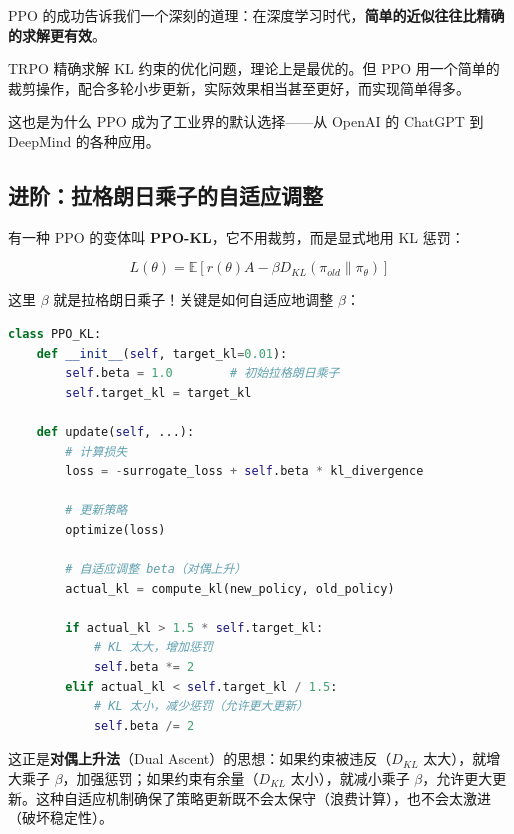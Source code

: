 \begin{remark}
PPO 的成功告诉我们一个深刻的道理：在深度学习时代，\textbf{简单的近似往往比精确的求解更有效}。

TRPO 精确求解 KL 约束的优化问题，理论上是最优的。但 PPO 用一个简单的裁剪操作，配合多轮小步更新，实际效果相当甚至更好，而实现简单得多。

这也是为什么 PPO 成为了工业界的默认选择——从 OpenAI 的 ChatGPT 到 DeepMind 的各种应用。
\end{remark}

\subsection{进阶：拉格朗日乘子的自适应调整}

有一种 PPO 的变体叫 \textbf{PPO-KL}，它不用裁剪，而是显式地用 KL 惩罚：

\begin{equation}
    L(\theta) = \mathbb{E}\left[ r(\theta) A - \beta D_{KL}(\pi_{old} \| \pi_\theta) \right]
\end{equation}

这里 $\beta$ 就是拉格朗日乘子！关键是如何自适应地调整 $\beta$：

\begin{lstlisting}[language=Python, caption={PPO-KL 的自适应拉格朗日乘子}]
class PPO_KL:
    def __init__(self, target_kl=0.01):
        self.beta = 1.0        # 初始拉格朗日乘子
        self.target_kl = target_kl
        
    def update(self, ...):
        # 计算损失
        loss = -surrogate_loss + self.beta * kl_divergence
        
        # 更新策略
        optimize(loss)
        
        # 自适应调整 beta（对偶上升）
        actual_kl = compute_kl(new_policy, old_policy)
        
        if actual_kl > 1.5 * self.target_kl:
            # KL 太大，增加惩罚
            self.beta *= 2
        elif actual_kl < self.target_kl / 1.5:
            # KL 太小，减少惩罚（允许更大更新）
            self.beta /= 2
\end{lstlisting}

这正是\textbf{对偶上升法}（Dual Ascent）的思想：如果约束被违反（$D_{KL}$ 太大），就增大乘子 $\beta$，加强惩罚；如果约束有余量（$D_{KL}$ 太小），就减小乘子 $\beta$，允许更大更新。这种自适应机制确保了策略更新既不会太保守（浪费计算），也不会太激进（破坏稳定性）。

